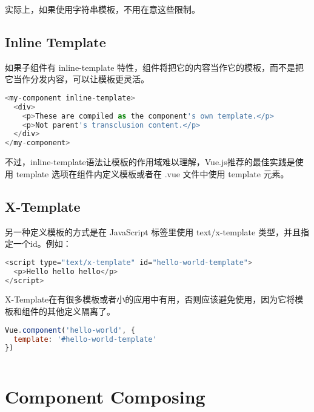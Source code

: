 实际上，如果使用字符串模板，不用在意这些限制。


\subsection{Inline Template}



如果子组件有 inline-template 特性，组件将把它的内容当作它的模板，而不是把它当作分发内容，可以让模板更灵活。

\begin{lstlisting}[language=JavaScript]
<my-component inline-template>
  <div>
    <p>These are compiled as the component's own template.</p>
    <p>Not parent's transclusion content.</p>
  </div>
</my-component>
\end{lstlisting}

不过，inline-template语法让模板的作用域难以理解，Vue.js推荐的最佳实践是使用 template 选项在组件内定义模板或者在 .vue 文件中使用 template 元素。


\subsection{X-Template}


另一种定义模板的方式是在 JavaScript 标签里使用 text/x-template 类型，并且指定一个id。例如：


\begin{lstlisting}[language=JavaScript]
<script type="text/x-template" id="hello-world-template">
  <p>Hello hello hello</p>
</script>
\end{lstlisting}


X-Template在有很多模板或者小的应用中有用，否则应该避免使用，因为它将模板和组件的其他定义隔离了。

\begin{lstlisting}[language=JavaScript]
Vue.component('hello-world', {
  template: '#hello-world-template'
})
\end{lstlisting}





\begin{lstlisting}[language=JavaScript]

\end{lstlisting}






\section{Component Composing}

